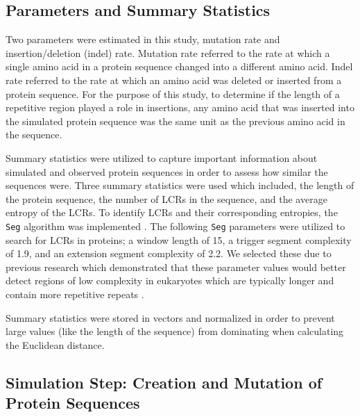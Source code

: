 \documentclass{article}
\begin{document}
\subsection{Parameters and Summary Statistics}

Two parameters were estimated in this study, mutation rate and insertion/deletion (indel) rate. Mutation rate referred to the rate at which a single amino acid in a protein sequence changed into a different amino acid. Indel rate referred to the rate at which an amino acid was deleted or inserted from a protein sequence. For the purpose of this study, to determine if the length of a repetitive region played a role in insertions, any amino acid that was inserted into the simulated protein sequence was the same unit as the previous amino acid in the sequence.

Summary statistics were utilized to capture important information about simulated and observed protein sequences in order to assess how similar the sequences were. Three summary statistics were used which included, the length of the protein sequence, the number of LCRs in the sequence, and the average entropy of the LCRs. To identify LCRs and their corresponding entropies, the \texttt{Seg} algorithm was implemented \citep{wootton1993statistics}. The following \texttt{Seg} parameters were utilized to search for LCRs in proteins; a window length of 15, a trigger segment complexity of 1.9, and an extension segment complexity of 2.2. We selected these due to previous research which demonstrated that these parameter values would better detect regions of low complexity in eukaryotes which are typically longer and contain more repetitive repeats \citep{huntley2000evolution}.

Summary statistics were stored in vectors and normalized in order to prevent large values (like the length of the sequence) from dominating when calculating the Euclidean distance.

\subsection{Simulation Step: Creation and Mutation of Protein Sequences}
\end{document}
